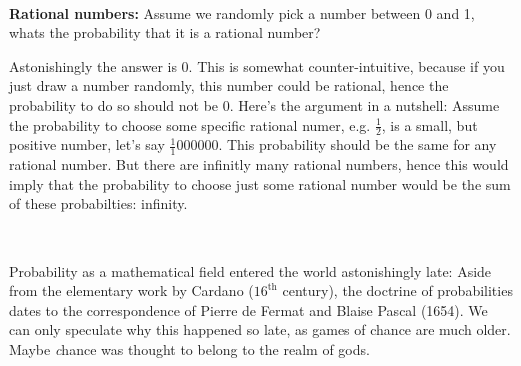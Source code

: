 \documentclass[twoside,11pt,a4paper]{article}
\newif\ifEN \ENtrue	                %
\def\tr|#1|#2|{\ifEN #2\else #1\fi}     %
\theoremstyle{definition}
\newcounter{exc}
\def\answerline#1{%
   \ifhmode\\[1ex]\fcolorbox{solbox}{solbox}{\hbox to \linewidth{\vbox to #1\baselineskip{}}}%
   \else\fcolorbox{solbox}{solbox}{\hbox to \linewidth{\vbox to #1\baselineskip{}}}%
   \fi
 }
\def\aside#1{\marginpar{\scriptsize #1}}
\begin{document}
\answerline{5}
\begin{exc}
  \textbf{\tr|Rationale Zahlen|Rational numbers|:}
  \tr|Wir ziehen zufällig eine reelle Zahle zwischen 0 und 1. Wie gross ist die Wahrscheinlichkeit,
  dass die gezogene Zahl rational ist?
  |Assume we randomly pick a number between 0 and 1,
  whats the probability that it is a rational number? |
\end{exc}
\begin{Answer}
  \tr|Erstaunlicherweise ist die Antwort 0. Das ist nicht sehr intuitiv, weil die gezogene Zahl ja
  sehr wohl rational sein könnte, also sollte die Wahrscheinlickeit nicht 0 sein.
  Ganz kurz gefasst geht das Argument folgendermassen:
  Nehmen wir an, die Wahrscheinlichkeit eine ganz bestimmte rationale Zahl (z.B. $\frac12$) zu ziehen sei
  eine kleine aber positive Zahl (z.B. $\frac1{1000000}$). Diese Wahrscheinlichkeit sollte die gleiche sein für
  jede andere rationale Zahl. Aber es gibt unendlich viele rationale Zahlen zwischen 0 und 1  und deshalb
  wäre die Wahrscheinlichkeit irgendeine rationale Zahl zu ziehen die Summe dieser Wahrscheinlichkeiten:
  Unendlich. 
  |Astonishingly the answer is 0. This is somewhat counter-intuitive, because if you just draw a number randomly,
  this number could be rational, hence the probability to do so should not be 0. Here's the argument in a
  nutshell: Assume the probability to choose some specific rational numer, e.g. $\frac12$,
  is a small, but positive number, let's say $\frac1{1000000}$. This probability should be the same
  for any rational number. But there are infinitly many rational numbers, hence this would imply that the
  probability to choose just some rational number would be the sum of these probabilties: infinity. |
\newpage
\end{Answer}
\answerline{5}
\par\bigskip\bigskip



\newpage
\tr|\emph{Wahrscheinlichkeit} als mathematische Disziplin ist erstaunlich neu: 
    Sie beginnt mit einem Briefwechsel zwischen \emph{Pierre der Fermat} und \emph{Blaise Pascal} 
     im Jahr 1654. Wir können nur spekulieren, warum dies so spät geschah, denn Glücksspiele wurden zu allen 
     Zeiten gespielt. Vielleicht fand man bis dahin, dass \emph{Zufall} in den Zuständigkeitsbereich der Götter fiel. 
    |Probability as a mathematical field entered the world astonishingly late:
    Aside from the elementary work by Cardano ($16^{\text{th}}$ century),
    the doctrine of probabilities dates to the correspondence of Pierre de Fermat and Blaise Pascal (1654). 
    We can only speculate why this happened so late, as games of chance are much older.
    Maybe \emph{chance} was thought to belong to the realm of gods. |
\end{document}
